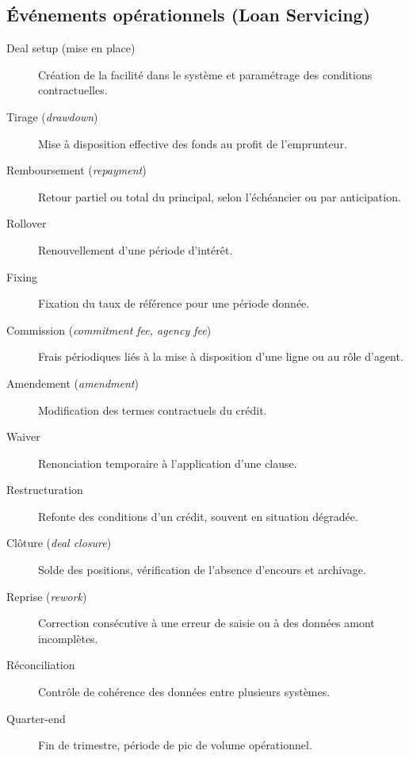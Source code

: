 \subsection*{Événements opérationnels (Loan Servicing)}
\begin{description}
  \item[Deal setup (mise en place)] Création de la facilité dans le système et paramétrage des conditions contractuelles.
  \item[Tirage (\textit{drawdown})] Mise à disposition effective des fonds au profit de l'emprunteur.
  \item[Remboursement (\textit{repayment})] Retour partiel ou total du principal, selon l'échéancier ou par anticipation.
  \item[Rollover] Renouvellement d'une période d'intérêt.
  \item[Fixing] Fixation du taux de référence pour une période donnée.
  \item[Commission (\textit{commitment fee, agency fee})] Frais périodiques liés à la mise à disposition d'une ligne ou au rôle d'agent.
  \item[Amendement (\textit{amendment})] Modification des termes contractuels du crédit.
  \item[Waiver] Renonciation temporaire à l'application d'une clause.
  \item[Restructuration] Refonte des conditions d'un crédit, souvent en situation dégradée.
  \item[Clôture (\textit{deal closure})] Solde des positions, vérification de l'absence d'encours et archivage.
  \item[Reprise (\textit{rework})] Correction consécutive à une erreur de saisie ou à des données amont incomplètes.
  \item[Réconciliation] Contrôle de cohérence des données entre plusieurs systèmes.
  \item[Quarter-end] Fin de trimestre, période de pic de volume opérationnel.
\end{description}

